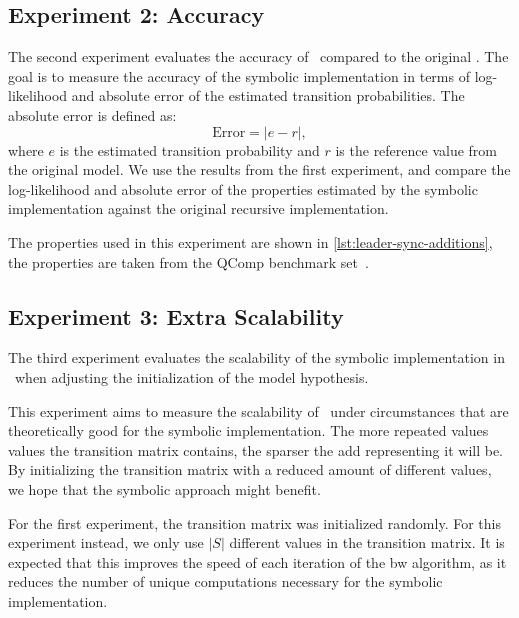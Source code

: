 \subsection{Experiment 2: Accuracy}\label{sec:exp_accuracy}
The second experiment evaluates the accuracy of \JajapyTwo\ compared to the original \Jajapy.
The goal is to measure the accuracy of the symbolic implementation in terms of log-likelihood and absolute error of the estimated transition probabilities.
The absolute error is defined as:
\[
    \text{Error} = |e - r|,
\]
where $e$ is the estimated transition probability and $r$ is the reference value from the original model.
We use the results from the first experiment, and compare the log-likelihood and absolute error of the properties estimated by the symbolic implementation against the original recursive implementation.

The properties used in this experiment are shown in \autoref{lst:leader-sync-additions}, the properties are taken from the QComp benchmark set~\cite{hartmanns2019quantitative}.


\subsection{Experiment 3: Extra Scalability}\label{sec:exp_extra_scalability}
The third experiment evaluates the scalability of the symbolic implementation in \JajapyTwo\ when adjusting the initialization of the model hypothesis.

This experiment aims to measure the scalability of \JajapyTwo\ under circumstances that are theoretically good for the symbolic implementation.
The more repeated values values the transition matrix contains, the sparser the \gls{add} representing it will be.
By initializing the transition matrix with a reduced amount of different values, we hope that the symbolic approach might benefit.

For the first experiment, the transition matrix was initialized randomly.
For this experiment instead, we only use $|S|$ different values in the transition matrix.
It is expected that this improves the speed of each iteration of the \gls{bw} algorithm, as it reduces the number of unique computations necessary for the symbolic implementation.



